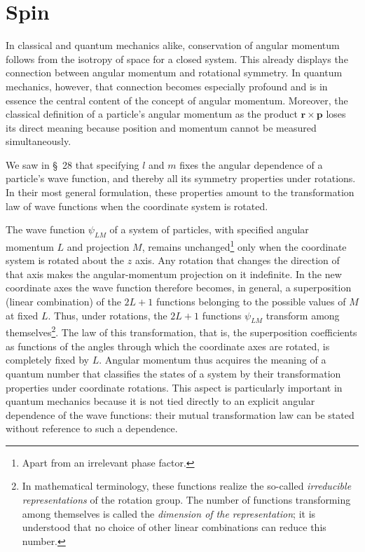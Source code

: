 \section{Spin}

In classical and quantum mechanics alike, conservation of angular momentum
follows from the isotropy of space for a closed system. This already displays
the connection between angular momentum and rotational symmetry. In quantum
mechanics, however, that connection becomes especially profound and is in
essence the central content of the concept of angular momentum. Moreover, the
classical definition of a particle's angular momentum as the product
$\mathbf r\times\mathbf p$ loses its direct meaning because position and
momentum cannot be measured simultaneously.

We saw in \S~28 that specifying $l$ and $m$ fixes the angular dependence of a
particle's wave function, and thereby all its symmetry properties under
rotations. In their most general formulation, these properties amount to the
transformation law of wave functions when the coordinate system is rotated.

The wave function $\psi_{LM}$ of a system of particles, with specified angular
momentum $L$ and projection $M$, remains unchanged\footnote{Apart from an
irrelevant phase factor.} only when the coordinate system is rotated about the
$z$ axis. Any rotation that changes the direction of that axis makes the
angular-momentum projection on it indefinite. In the new coordinate axes the
wave function therefore becomes, in general, a superposition (linear
combination) of the $2L+1$ functions belonging to the possible values of $M$
at fixed $L$. Thus, under rotations, the $2L+1$ functions $\psi_{LM}$
transform among themselves\footnote{In mathematical terminology, these
functions realize the so-called \emph{irreducible representations} of the
rotation group. The number of functions transforming among themselves is
called the \emph{dimension of the representation}; it is understood that no
choice of other linear combinations can reduce this number.}. The law of
this transformation, that is, the superposition coefficients as functions of
the angles through which the coordinate axes are
rotated, is completely fixed by $L$. Angular momentum thus acquires the
meaning of a quantum number that classifies the states of a system by their
transformation properties under coordinate rotations. This aspect is
particularly important in quantum mechanics because it is not tied directly
to an explicit angular dependence of the wave functions: their mutual
transformation law can be stated without reference to such a dependence.

